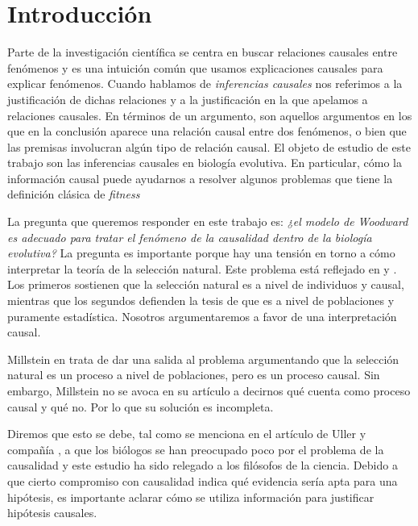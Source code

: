 
\chapter*{Introducción}


\noindent Parte de la investigación científica se centra en buscar relaciones causales entre fenómenos y es una intuición común que usamos explicaciones causales para explicar fenómenos. Cuando hablamos de \textit{inferencias causales} nos referimos a la justificación de dichas relaciones y a la justificación en la que apelamos a relaciones causales. En términos de un argumento, son aquellos argumentos en los que en la conclusión aparece una relación causal entre dos fenómenos, o bien que las premisas involucran algún tipo de relación causal. El objeto de estudio de este trabajo son las inferencias causales en biología evolutiva. En particular, cómo la información causal puede ayudarnos a resolver algunos problemas que tiene la definición clásica de \emph{fitness}

La pregunta que queremos responder en este trabajo es: \textit{¿el modelo de Woodward es adecuado para tratar el fenómeno de la causalidad dentro de la biología evolutiva?} La pregunta es importante porque hay una tensión en torno a cómo interpretar la teoría de la selección natural. Este problema está reflejado en \cite{Bouchard2004} y \cite{Walsh2002}. Los primeros sostienen que la selección natural es a nivel de individuos y causal, mientras que los segundos defienden la tesis de que es a nivel de poblaciones y puramente estadística. Nosotros argumentaremos a favor de una interpretación causal.

Millstein en \citeyear{Millstein2006} trata de dar una salida al problema argumentando que la selección natural es un proceso a nivel de poblaciones, pero es un proceso causal. Sin embargo, Millstein no se avoca en su artículo a decirnos qué cuenta como proceso causal y qué no. Por lo que su solución es incompleta.

Diremos que esto se debe, tal como se menciona en el artículo de Uller y compañía \citeyear{Uller2020}, a que los biólogos se han preocupado poco por el problema de la causalidad y este estudio ha sido relegado a los filósofos de la ciencia. Debido a que cierto compromiso con causalidad indica qué evidencia sería apta para una hipótesis, es importante aclarar cómo se utiliza información para justificar hipótesis causales.

